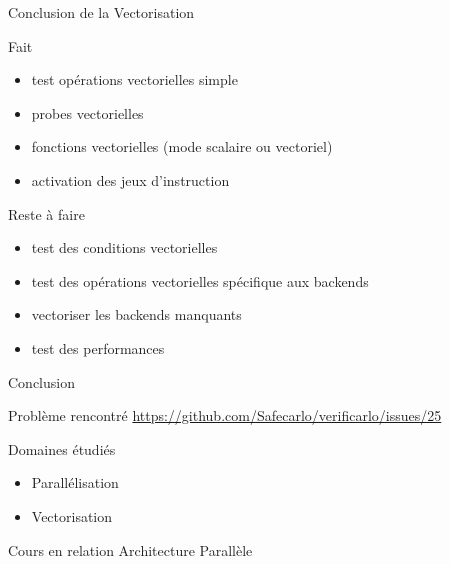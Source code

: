 \documentclass{beamer}
\begin{document}
\begin{frame}{Conclusion de la Vectorisation}

  \begin{block}{Fait}
    \begin{itemize}
    \item test opérations vectorielles simple
    \item probes vectorielles
    \item fonctions vectorielles (mode scalaire ou vectoriel)
    \item activation des jeux d'instruction
    \end{itemize}
  \end{block}

  \begin{alertblock}{Reste à faire}
    \begin{itemize}
    \item test des conditions vectorielles
    \item test des opérations vectorielles spécifique aux backends
    \item vectoriser les backends manquants
    \item test des performances
    \end{itemize}
  \end{alertblock}

\end{frame}

\begin{frame}{Conclusion}

  \begin{block}{Problème rencontré}
    \url{https://github.com/Safecarlo/verificarlo/issues/25}
  \end{block}

  \begin{block}{Domaines étudiés}
    \begin{itemize}
    \item Parallélisation
    \item Vectorisation
    \end{itemize}
  \end{block}
  
  \begin{block}{Cours en relation}
    Architecture Parallèle
  \end{block}

\end{frame}
\end{document}
